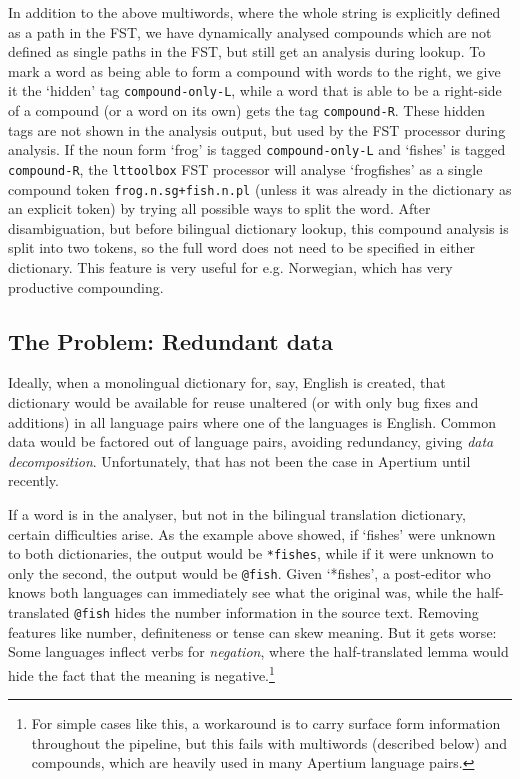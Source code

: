 \documentclass[10pt, a4paper]{article}
\newcommand{\ana}[1]{\texttt{#1}}
\newcommand{\f}[1]{`#1'}
\newcommand{\tool}[1]{\texttt{#1}}
\begin{document}
In addition to the above multiwords, where the whole string is
explicitly defined as a path in the FST, we have dynamically analysed
compounds which are not defined as single paths in the FST, but still
get an analysis during lookup. To mark a word as being able to form a
compound with words to the right, we give it the \f{hidden} tag
\ana{compound-only-L}, while a word that is able to be a right-side of
a compound (or a word on its own) gets the tag \ana{compound-R}.
These hidden tags are not shown in the analysis output, but used by
the FST processor during analysis. If the noun form \f{frog} is tagged
\ana{compound-only-L} and \f{fishes} is tagged \ana{compound-R}, the
\tool{lttoolbox} FST processor will analyse \f{frogfishes} as a single
compound token \ana{frog.n.sg+fish.n.pl} (unless it was already in the
dictionary as an explicit token) by trying all possible ways to split
the word. After disambiguation, but before bilingual dictionary
lookup, this compound analysis is split into two tokens, so the full
word does not need to be specified in either dictionary. This feature
is very useful for e.g.  Norwegian, which has very productive
compounding.

\subsection{The Problem: Redundant data}
\label{sec:problem}

Ideally, when a monolingual dictionary for, say, English is created,
that dictionary would be available for reuse unaltered (or with only
bug fixes and additions) in all language pairs where one of the
languages is English. Common data would be factored out of language
pairs, avoiding redundancy, giving \emph{data decomposition}.
Unfortunately, that has not been the case in Apertium until recently.

If a word is in the analyser, but not in the bilingual translation
dictionary, certain difficulties arise. As the example above showed,
if \f{fishes} were unknown to both dictionaries, the output would be
\ana{*fishes}, while if it were unknown to only the second, the output
would be \ana{@fish}. Given \f{*fishes}, a post-editor who knows both
languages can immediately see what the original was, while the
half-translated \ana{@fish} hides the number information in the source
text. Removing features like number, definiteness or tense can skew
meaning.  But it gets worse: Some languages inflect verbs for
\emph{negation}, where the half-translated lemma would hide the fact
that the meaning is negative.\footnote{For simple cases like this, a
    workaround is to carry surface form information throughout the
    pipeline, but this fails with multiwords (described below) and
    compounds, which are heavily used in many Apertium language
    pairs.}
\end{document}
